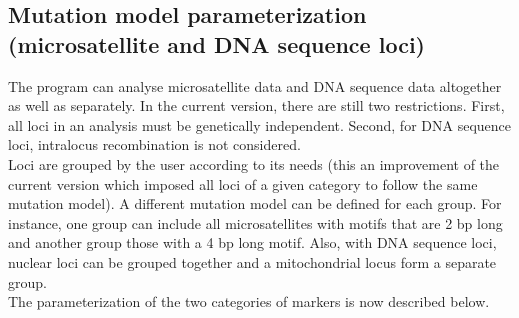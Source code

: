 \newpage
\subsection{Mutation model parameterization (microsatellite and DNA sequence loci)}
The program can analyse microsatellite data and DNA sequence data altogether as well as separately. In the current version, there  are still two restrictions. First, all loci in an analysis must be genetically independent. Second, for DNA sequence loci, intralocus recombination is not considered.\\

Loci are grouped by the user according to its needs (this an improvement of the current version which imposed all loci of a given category to follow the same mutation model). A different mutation model can be defined for each group. For instance, one group can include all microsatellites with motifs that are 2 bp long and another group those with a 4 bp long motif. Also, with DNA sequence loci, nuclear loci can be grouped together and a mitochondrial locus form a separate group.\\ 
 
The parameterization of the two categories of markers is now described below. 

